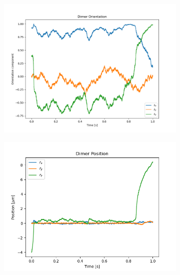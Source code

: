 \documentclass[final,  3p]{elsarticle}
\begin{document}
\begin{figure}[h]
	\centering
	\begin{subfigure}{0.32\textwidth}
		\subcaption{}
		\includegraphics[width=\textwidth]{./Images/fig7a.png}
	\end{subfigure}
	\begin{subfigure}{0.32\textwidth}
		\subcaption{}
		\includegraphics[width=\textwidth]{./Images/fig7b.png}
	\end{subfigure}
	\begin{subfigure}{0.32\textwidth}
		\subcaption{}

\end{subfigure}
\end{figure}
\end{document}
